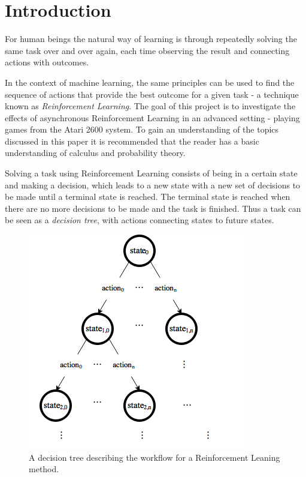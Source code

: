 \documentclass[11pt]{article}
\begin{document}
\maketitle

\section{Introduction}

For human beings the natural way of learning is through repeatedly solving the same
task over and over again, each time observing the result and connecting
actions with outcomes.

In the context of machine learning, the same principles can be used to find the
sequence of actions that provide the best outcome for a given task
- a technique known as \textit{Reinforcement Learning}.
The goal of this project is to investigate the effects of asynchronous Reinforcement
Learning in an advanced setting - playing games from the Atari 2600 system\cite{openAIEnvs}.
To gain an understanding of the topics discussed in this paper it is recommended
that the reader has a basic understanding of calculus and
probability theory.

Solving a task using Reinforcement Learning consists of being in a certain state and making a decision,
which leads to a new state with a new set of decisions to be made until
a terminal state is reached.
The terminal state is reached when there are no more decisions to be made
and the task is finished.
Thus a task can be seen as a \textit{decision tree}, with actions connecting states to future states.
\begin{figure}[H]
    \centering
    \includegraphics[scale=0.5]{include/decision_tree.png}
    \caption{A decision tree describing the workflow for a Reinforcement Leaning
    method.}
    \label{fig:dec_tree}
\end{figure}
\end{document}
